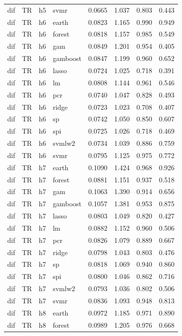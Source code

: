 \begin{ThreePartTable}
\begin{longtable}[t]{llclcccc}
dif & TR & h5 & svmr & 0.0665 & 1.037 & 0.803 & 0.443\\
\addlinespace
dif & TR & h6 & earth & 0.0823 & 1.165 & 0.990 & 0.949\\
dif & TR & h6 & forest & 0.0818 & 1.157 & 0.985 & 0.549\\
dif & TR & h6 & gam & 0.0849 & 1.201 & 0.954 & 0.405\\
dif & TR & h6 & gamboost & 0.0847 & 1.199 & 0.960 & 0.652\\
dif & TR & h6 & lasso & 0.0724 & 1.025 & 0.718 & 0.391\\
dif & TR & h6 & lm & 0.0808 & 1.144 & 0.961 & 0.546\\
dif & TR & h6 & pcr & 0.0740 & 1.047 & 0.828 & 0.493\\
dif & TR & h6 & ridge & 0.0723 & 1.023 & 0.708 & 0.407\\
dif & TR & h6 & sp & 0.0742 & 1.050 & 0.850 & 0.607\\
dif & TR & h6 & spi & 0.0725 & 1.026 & 0.718 & 0.469\\
dif & TR & h6 & svmlw2 & 0.0734 & 1.039 & 0.886 & 0.759\\
dif & TR & h6 & svmr & 0.0795 & 1.125 & 0.975 & 0.772\\
\addlinespace
dif & TR & h7 & earth & 0.1090 & 1.424 & 0.968 & 0.926\\
dif & TR & h7 & forest & 0.0881 & 1.151 & 0.937 & 0.518\\
dif & TR & h7 & gam & 0.1063 & 1.390 & 0.914 & 0.656\\
dif & TR & h7 & gamboost & 0.1057 & 1.381 & 0.953 & 0.875\\
dif & TR & h7 & lasso & 0.0803 & 1.049 & 0.820 & 0.427\\
dif & TR & h7 & lm & 0.0882 & 1.152 & 0.960 & 0.506\\
dif & TR & h7 & pcr & 0.0826 & 1.079 & 0.889 & 0.667\\
dif & TR & h7 & ridge & 0.0798 & 1.043 & 0.803 & 0.476\\
dif & TR & h7 & sp & 0.0818 & 1.069 & 0.940 & 0.860\\
dif & TR & h7 & spi & 0.0800 & 1.046 & 0.862 & 0.716\\
dif & TR & h7 & svmlw2 & 0.0793 & 1.036 & 0.802 & 0.506\\
dif & TR & h7 & svmr & 0.0836 & 1.093 & 0.948 & 0.813\\
\addlinespace
dif & TR & h8 & earth & 0.0972 & 1.185 & 0.971 & 0.890\\
dif & TR & h8 & forest & 0.0989 & 1.205 & 0.976 & 0.668\\

\end{longtable}
\end{ThreePartTable}
